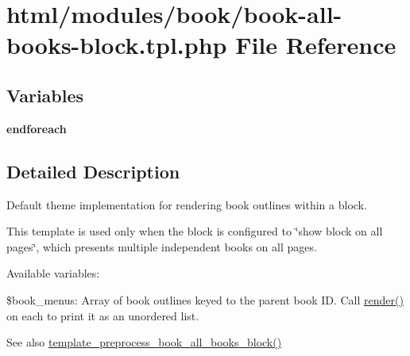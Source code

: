\hypertarget{book-all-books-block_8tpl_8php}{
\section{html/modules/book/book-\/all-\/books-\/block.tpl.php File Reference}
\label{book-all-books-block_8tpl_8php}
}
\subsection*{Variables}
\begin{DoxyCompactItemize}
\item 
\hypertarget{book-all-books-block_8tpl_8php_a672d9707ef91db026c210f98cc601123}{
{\bfseries endforeach}}
\label{book-all-books-block_8tpl_8php_a672d9707ef91db026c210f98cc601123}

\end{DoxyCompactItemize}


\subsection{Detailed Description}
Default theme implementation for rendering book outlines within a block.

This template is used only when the block is configured to \char`\"{}show block on all
 pages\char`\"{}, which presents multiple independent books on all pages.

Available variables:
\begin{DoxyItemize}
\item \$book\_\-menus: Array of book outlines keyed to the parent book ID. Call \hyperlink{common_8inc_a5f4b2009c1caf78549203cec9b324305}{render()} on each to print it as an unordered list.
\end{DoxyItemize}

\begin{DoxySeeAlso}{See also}
\hyperlink{book_8module_a57d4d9c4e795c96dc9828781404fc577}{template\_\-preprocess\_\-book\_\-all\_\-books\_\-block()} 
\end{DoxySeeAlso}
